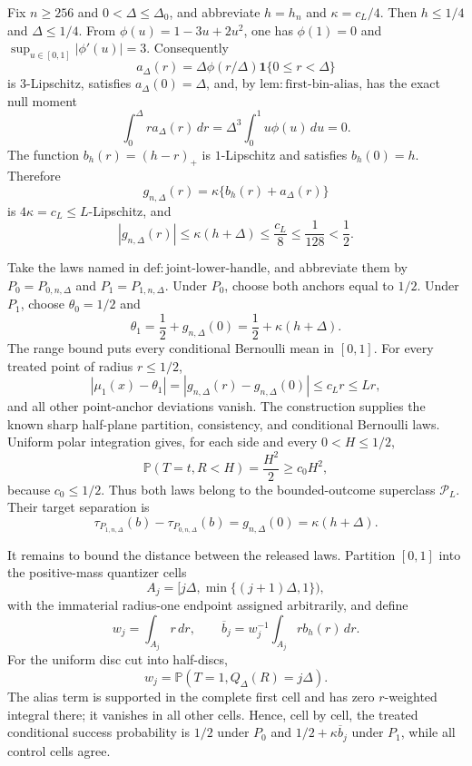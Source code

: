 Fix \(n\geq256\) and \(0<\Delta\leq\Delta_0\), and abbreviate \(h=h_n\) and \(\kappa=c_L/4\).  Then \(h\leq1/4\) and \(\Delta\leq1/4\).  From \(\phi(u)=1-3u+2u^2\), one has \(\phi(1)=0\) and \(\sup_{u\in[0,1]}|\phi'(u)|=3\).  Consequently
\[
 a_\Delta(r)=\Delta\phi(r/\Delta)\mathbf1\{0\leq r<\Delta\}
\]
is \(3\)-Lipschitz, satisfies \(a_\Delta(0)=\Delta\), and, by \(\mathrm{lem:first\text{-}bin\text{-}alias}\), has the exact null moment
\[
 \int_0^\Delta ra_\Delta(r)\,dr
 =\Delta^3\int_0^1u\phi(u)\,du=0.
\]
The function \(b_h(r)=(h-r)_+\) is \(1\)-Lipschitz and satisfies \(b_h(0)=h\).  Therefore
\[
 g_{n,\Delta}(r)=\kappa\{b_h(r)+a_\Delta(r)\}
\]
is \(4\kappa=c_L\leq L\)-Lipschitz, and
\[
 |g_{n,\Delta}(r)|
 \leq\kappa(h+\Delta)
 \leq\frac{c_L}{8}
 \leq\frac1{128}<\frac12.
\]

Take the laws named in \(\mathrm{def:joint\text{-}lower\text{-}handle}\), and abbreviate them by \(P_0=P_{0,n,\Delta}\) and \(P_1=P_{1,n,\Delta}\).  Under \(P_0\), choose both anchors equal to \(1/2\).  Under \(P_1\), choose \(\theta_0=1/2\) and
\[
 \theta_1=\frac12+g_{n,\Delta}(0)
 =\frac12+\kappa(h+\Delta).
\]
The range bound puts every conditional Bernoulli mean in \([0,1]\).  For every treated point of radius \(r\leq1/2\),
\[
 |\mu_1(x)-\theta_1|
 =|g_{n,\Delta}(r)-g_{n,\Delta}(0)|
 \leq c_Lr\leq Lr,
\]
and all other point-anchor deviations vanish.  The construction supplies the known sharp half-plane partition, consistency, and conditional Bernoulli laws.  Uniform polar integration gives, for each side and every \(0<H\leq1/2\),
\[
 \mathbb P(T=t,R<H)=\frac{H^2}{2}\geq c_0H^2,
\]
because \(c_0\leq1/2\).  Thus both laws belong to the bounded-outcome superclass \(\mathcal P_L\).  Their target separation is
\[
 \tau_{P_{1,n,\Delta}}(b)-\tau_{P_{0,n,\Delta}}(b)
 =g_{n,\Delta}(0)=\kappa(h+\Delta).
\]

It remains to bound the distance between the released laws.  Partition \([0,1]\) into the positive-mass quantizer cells
\[
 A_j=[j\Delta,\min\{(j+1)\Delta,1\}),
\]
with the immaterial radius-one endpoint assigned arbitrarily, and define
\[
 w_j=\int_{A_j}r\,dr,
 \qquad
 \overline b_j=w_j^{-1}\int_{A_j}rb_h(r)\,dr.
\]
For the uniform disc cut into half-discs,
\[
 w_j=\mathbb P(T=1,Q_\Delta(R)=j\Delta).
\]
The alias term is supported in the complete first cell and has zero \(r\)-weighted integral there; it vanishes in all other cells.  Hence, cell by cell, the treated conditional success probability is \(1/2\) under \(P_0\) and \(1/2+\kappa\overline b_j\) under \(P_1\), while all control cells agree.

